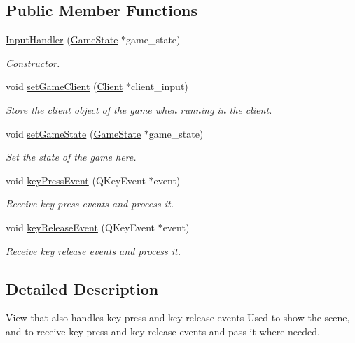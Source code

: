 \subsection*{Public Member Functions}
\begin{DoxyCompactItemize}
\item 
\hyperlink{classInputHandler_a052ce3adff4a84f49b8380449cf05a5f}{Input\-Handler} (\hyperlink{classGameState}{Game\-State} $\ast$game\-\_\-state)
\begin{DoxyCompactList}\small\item\em Constructor. \end{DoxyCompactList}\item 
void \hyperlink{classInputHandler_a84d1b1ca593d4764114f75c739a8328a}{set\-Game\-Client} (\hyperlink{classClient}{Client} $\ast$client\-\_\-input)
\begin{DoxyCompactList}\small\item\em Store the client object of the game when running in the client. \end{DoxyCompactList}\item 
void \hyperlink{classInputHandler_a30e6f3d86c107f556ff6d904af33a09a}{set\-Game\-State} (\hyperlink{classGameState}{Game\-State} $\ast$game\-\_\-state)
\begin{DoxyCompactList}\small\item\em Set the state of the game here. \end{DoxyCompactList}\item 
void \hyperlink{classInputHandler_a8a3c7799e3930c10da915c7aebd1ae89}{key\-Press\-Event} (Q\-Key\-Event $\ast$event)
\begin{DoxyCompactList}\small\item\em Receive key press events and process it. \end{DoxyCompactList}\item 
void \hyperlink{classInputHandler_a399f396dc428ad1ada35a40170952c55}{key\-Release\-Event} (Q\-Key\-Event $\ast$event)
\begin{DoxyCompactList}\small\item\em Receive key release events and process it. \end{DoxyCompactList}\end{DoxyCompactItemize}


\subsection{Detailed Description}
View that also handles key press and key release events Used to show the scene, and to receive key press and key release events and pass it where needed. 

